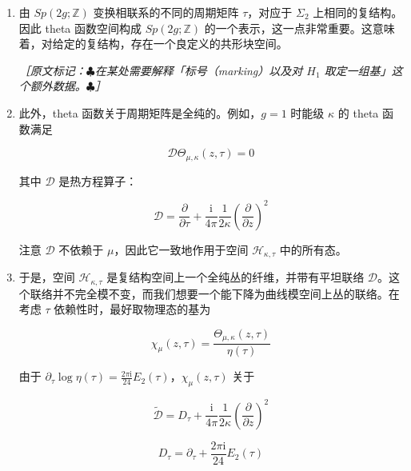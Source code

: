\begin{enumerate}
  \item 由 $Sp(2g;\mathbb{Z})$ 变换相联系的不同的周期矩阵 $\tau$，对应于 $\Sigma_2$ 上相同的复结构。因此 theta 函数空间构成 $Sp(2g;\mathbb{Z})$ 的一个表示，这一点非常重要。这意味着，对给定的复结构，存在一个良定义的共形块空间。

  {\small\itshape ［原文标记：$\clubsuit$在某处需要解释「标号（marking）以及对 $H_1$ 取定一组基」这个额外数据。$\clubsuit$］}

  \item 此外，theta 函数关于周期矩阵是全纯的。例如，$g=1$ 时能级 $\kappa$ 的 theta 函数满足

  \begin{equation}
    \mathcal{D}\Theta_{\mu,\kappa}(z,\tau)=0
    \tag{2.244}
    \label{eq:2.244}
  \end{equation}

  其中 $\mathcal{D}$ 是热方程算子：

  \begin{equation}
    \mathcal{D}=\frac{\partial}{\partial\tau}+\frac{\mathrm{i}}{4\pi}\frac{1}{2\kappa}\left(\frac{\partial}{\partial z}\right)^2
    \tag{2.245}
    \label{eq:2.245}
  \end{equation}

  注意 $\mathcal{D}$ 不依赖于 $\mu$，因此它一致地作用于空间 $\mathcal{H}_{\kappa,\tau}$ 中的所有态。

  \item 于是，空间 $\mathcal{H}_{\kappa,\tau}$ 是复结构空间上一个全纯丛的纤维，并带有平坦联络 $\mathcal{D}$。这个联络并不完全模不变，而我们想要一个能下降为曲线模空间上丛的联络。在考虑 $\tau$ 依赖性时，最好取物理态的基为

  \begin{equation}
    \chi_\mu(z,\tau)=\frac{\Theta_{\mu,\kappa}(z,\tau)}{\eta(\tau)}
    \tag{2.246}
    \label{eq:2.246}
  \end{equation}

  由于 $\partial_\tau\log\eta(\tau)=\frac{2\pi\mathrm{i}}{24}E_2(\tau)$，$\chi_\mu(z,\tau)$ 关于

  \begin{equation}
    \widetilde{\mathcal{D}}=D_\tau+\frac{\mathrm{i}}{4\pi}\frac{1}{2\kappa}\left(\frac{\partial}{\partial z}\right)^2
    \tag{2.247}
    \label{eq:2.247}
  \end{equation}

  \begin{equation}
    D_\tau=\partial_\tau+\frac{2\pi\mathrm{i}}{24}E_2(\tau)
    \tag{2.248}
    \label{eq:2.248}
  \end{equation}


\end{enumerate}
